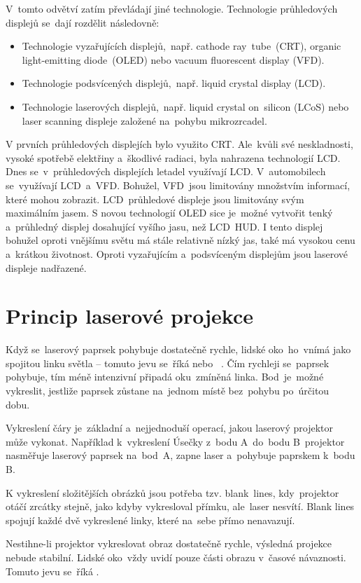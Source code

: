 V~tomto odvětví zatím převládají jiné technologie. Technologie průhledových displejů se~dají rozdělit následovně:
\begin{itemize}
  \item Technologie vyzařujících displejů,~např. cathode ray~tube~(CRT), organic light-emitting diode~(OLED) nebo vacuum fluorescent display (VFD).
  \item Technologie podsvícených displejů,~např. liquid crystal display (LCD).
  \item Technologie laserových displejů,~např. liquid crystal on~silicon (LCoS) nebo laser scanning displeje založené na~pohybu mikrozrcadel.~\cite{dev-of-laser-huds-in-driving}
\end{itemize}

V prvních průhledových displejích bylo využito CRT. Ale~kvůli své neskladnosti, vysoké spotřebě elektřiny a~škodlivé radiaci, byla nahrazena technologií LCD. Dnes se~v~průhledových displejích letadel využívají LCD. V~automobilech se~využívají LCD~a~VFD.
Bohužel, VFD~jsou limitovány množstvím informací, které mohou zobrazit. LCD~průhledové displeje jsou limitovány svým maximálním jasem.
S novou technologií OLED sice je~možné vytvořit tenký a~průhledný displej dosahující vyšího jasu, než LCD~HUD.
I tento displej bohužel oproti vnějšímu světu má stále relativně nízký jas, také má vysokou cenu a~krátkou životnost.
Oproti vyzařujícím a~podsvíceným displejům jsou laserové displeje nadřazené.~\cite{dev-of-laser-huds-in-driving}

\section{Princip laserové projekce}\label{sec:projection-princip}
Když se~laserový paprsek pohybuje dostatečně rychle, lidské oko~ho~vnímá jako spojitou linku světla -- tomuto jevu se~říká  nebo ~\cite{persistance-of-vision}.
Čím rychleji se~paprsek pohybuje, tím méně intenzivní připadá oku~zmíněná linka. Bod~je~možné vykreslit, jestliže paprsek zůstane na~jednom místě bez~pohybu po~úrčitou dobu.~\cite{laser-projection}

Vykreslení čáry je~základní a~nejjednoduší operací, jakou laserový projektor může vykonat. Například k~vykreslení Úsečky z~bodu A~do~bodu B~projektor nasměřuje laserový paprsek na~bod~A, zapne laser a~pohybuje paprskem k~bodu B.~\cite{laser-projection}

K vykreslení složitějších obrázků jsou potřeba tzv. blank\ lines, kdy~projektor otáčí zrcátky stejně, jako kdyby vykresloval přímku, ale~laser nesvítí. Blank lines spojují každé dvě vykreslené linky, které na~sebe přímo nenavazují.~\cite{laser-projection}

Nestihne-li projektor vykreslovat obraz dostatečně rychle, výsledná projekce nebude stabilní. Lidské oko~vždy uvidí pouze části obrazu v~časové návaznosti. Tomuto jevu se~říká .~\cite{laser-projection}
